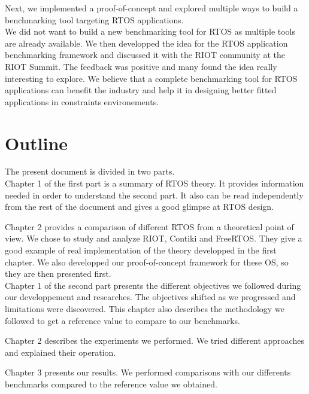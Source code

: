 Next, we implemented a proof-of-concept and explored multiple ways to build a benchmarking tool targeting RTOS applications.\\

We did not want to build a new benchmarking tool for RTOS as multiple tools are already available.
We then developped the idea for the RTOS application benchmarking framework and discussed it with the RIOT community at the RIOT Summit.
The feedback was positive and many found the idea really interesting to explore.
We believe that a complete benchmarking tool for RTOS applications can benefit the industry 
    and help it in designing better fitted applications in constraints environements.
%
%
\section*{Outline}
The present document is divided in two parts.\\

Chapter 1 of the first part is a summary of RTOS theory.
It provides information needed in order to understand the second part.
It also can be read independently from the rest of the document and gives a good glimpse at RTOS design.

Chapter 2 provides a comparison of different RTOS from a theoretical point of view.
We chose to study and analyze RIOT, Contiki and FreeRTOS.
They give a good example of real implementation of the theory developped in the first chapter.
We also developped our proof-of-concept framework for these OS, so they are then presented first.\\

Chapter 1 of the second part presents the different objectives we followed during our developpement and researches.
The objectives shifted as we progressed and limitations were discovered.
This chapter also describes the methodology we followed to get a reference value to compare to our benchmarks.

Chapter 2 describes the experiments we performed.
We tried different approaches and explained their operation.

Chapter 3 presents our results.
We performed comparisons with our differents benchmarks compared to the reference value we obtained.